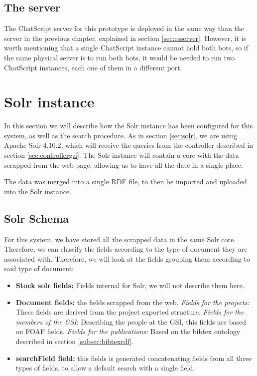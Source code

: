 \subsection{The server}

The ChatScript server for this prototype is deployed in the same way than the server in the previous chapter, explained in section \ref{sec:csserver}. However, it is worth mentioning that a single ChatScript instance cannot hold both bots, so if the same physical server is to run both bots, it would be needed to run two ChatScript instances, each one of them in a different port.

\section{Solr instance}

In this section we will describe how the Solr instance has been configured for this system, as well as the search procedure. As in section \ref{sec:solr}, we are using Apache Solr 4.10.2, which will receive the queries from the controller described in section \ref{sec:controllergsi}. The Solr instance will contain a core with the data scrapped from the web page, allowing us to have all the date in a single place.

The data was merged into a single RDF file, to then be imported and uploaded into the Solr instance.

\subsection{Solr Schema}

For this system, we have stored all the scrapped data in the same Solr core. Therefore, we can classify the fields according to the type of document they are associated with. Therefore, we will look at the fields grouping them according to said type of document:

\begin{itemize}
 \item \textbf{Stock solr fields:} Fields internal for Solr, we will not describe them here.
 \item \textbf{Document fields:} the fields scrapped from the web.
    \subitem \emph{Fields for the projects:} These fields are derived from the project exported structure.
    \subitem \emph{Fields for the members of the GSI}: Describing the people at the GSI, this fields are based on \ac{FOAF} fields.
    \subitem \emph{Fields for the publications:} Based on the bibtex ontology described in section \ref{subsec:bibtexrdf}.
 \item \textbf{searchField field:} this fields is generated concatenating fields from all three types of fields, to allow a default search with a single field.
\end{itemize}

